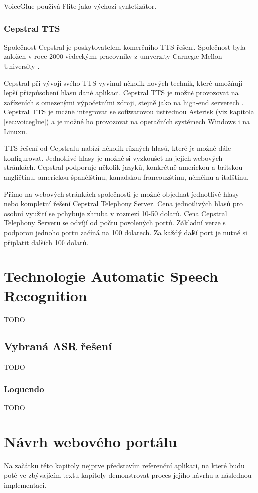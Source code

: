 \documentclass[ing,male,java,dept460]{diploma}						%
\begin{document}
VoiceGlue používá Flite jako výchozí syntetizátor.

\subsubsection{Cepstral TTS}
\label{sec:cepstral}
Společnost Cepstral je poskytovatelem komerčního TTS řešení. Společnost byla založen v roce 2000 vědeckými pracovníky z univerzity Carnegie Mellon University \cite{cepstral_wiki}.

Cepstral při vývoji svého TTS vyvinul několik nových technik, které umožňují lepší přizpůsobení hlasu dané aplikaci. Cepstral TTS je možné provozovat na zařízeních s omezenými výpočetními zdroji, stejně jako na high-end serverech \cite{cepstral_com}. Cepstral TTS je možné integrovat se softwarovou ústřednou Asterisk (viz kapitola \ref{sec:voiceglue}) a je možné ho provozovat na operačních systémech Windows i na Linuxu.

TTS řešení od Cepstralu nabízí několik různých hlasů, které je možné dále konfigurovat. Jednotlivé hlasy je možné si vyzkoušet na jejich webových stránkách. Cepstral podporuje několik jazyků, konkrétně americkou a britskou angličtinu, americkou španělštinu, kanadskou francouzštinu, němčinu a italštinu.

Přímo na webových stránkách společnosti je možné objednat jednotlivé hlasy nebo kompletní řešení Cepstral Telephony Server. Cena jednotlivých hlasů pro osobní využití se pohybuje zhruba v rozmezí 10-50 dolarů. Cena Cepstral Telephony Serveru se odvíjí od počtu povolených portů. Základní verze s podporou jednoho portu začíná na 100 dolarech. Za každý další port je nutné si připlatit dalších 100 dolarů.

\section{Technologie Automatic Speech Recognition}
\label{sec:ASR}
TODO

\subsection{Vybraná ASR řešení}
TODO

\subsubsection{Loquendo}
TODO

\section{Návrh webového portálu}
\label{sec:Navrh}
Na začátku této kapitoly nejprve představím referenční aplikaci, na které budu poté ve zbývajícím textu kapitoly demonstrovat proces jejího návrhu a následnou implementaci.
\end{document}
